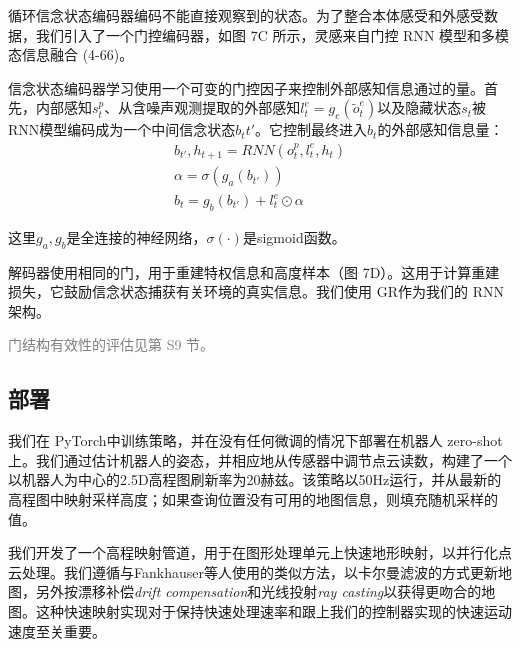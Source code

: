 循环信念状态编码器编码不能直接观察到的状态。为了整合本体感受和外感受数据，我们引入了一个门控编码器，如图 7C 所示，灵感来自门控 RNN 模型\cite[p]{Cho_van_Merrienboer_Gulcehre_Bahdanau_Bougares_Schwenk_Bengio_2014,Hochreiter_Schmidhuber_1997}和多模态信息融合 (4-66)。

信念状态编码器学习使用一个可变的门控因子来控制外部感知信息通过的量。首先，内部感知$s_t^p$、从含噪声观测提取的外部感知$l_t^e=g_e(\widetilde o_t^e)$以及隐藏状态$s_t$被RNN模型编码成为一个中间信念状态$b_t{t'}$。它控制最终进入$b_t$的外部感知信息量：
\begin{align}
  b_{t'},h_{t+1}=RNN(o_t^p,l_t^e,h_t)\\
  \alpha = \sigma (g_a(b_{t'}))\\
  b_t = g_b(b_{t'})+l_t^e \odot \alpha
\end{align}

这里$g_a,g_b$是全连接的神经网络，$\sigma(\cdot)$是sigmoid函数。

解码器使用相同的门，用于重建特权信息和高度样本（图 7D）。这用于计算重建损失，它鼓励信念状态捕获有关环境的真实信息。我们使用 GR\cite[p]{Cho_van_Merrienboer_Gulcehre_Bahdanau_Bougares_Schwenk_Bengio_2014}作为我们的 RNN 架构。

\textcolor{gray}{门结构有效性的评估见第 S9 节。}

\subsection[部署]{部署}

我们在 PyTorch\cite[p]{Paszke_Gross_Massa_Lerer_Bradbury_Chanan_Killeen_Lin_Gimelshein_Antiga_et_al_2019}中训练策略，并在没有任何微调的情况下部署在机器人 zero-shot上。我们通过估计机器人的姿态，并相应地从传感器中调节点云读数，构建了一个以机器人为中心的2.5D高程图刷新率为20赫兹。该策略以50Hz运行，并从最新的高程图中映射采样高度；如果查询位置没有可用的地图信息，则填充随机采样的值。

我们开发了一个高程映射管道，用于在图形处理单元上快速地形映射，以并行化点云处理。我们遵循与Fankhauser等人\cite[p]{Fankhauser_Bloesch_Hutter_2018}使用的类似方法，以卡尔曼滤波的方式更新地图，另外按漂移补偿\emph{drift compensation}和光线投射\emph{ray casting}以获得更吻合的地图。这种快速映射实现对于保持快速处理速率和跟上我们的控制器实现的快速运动速度至关重要。

